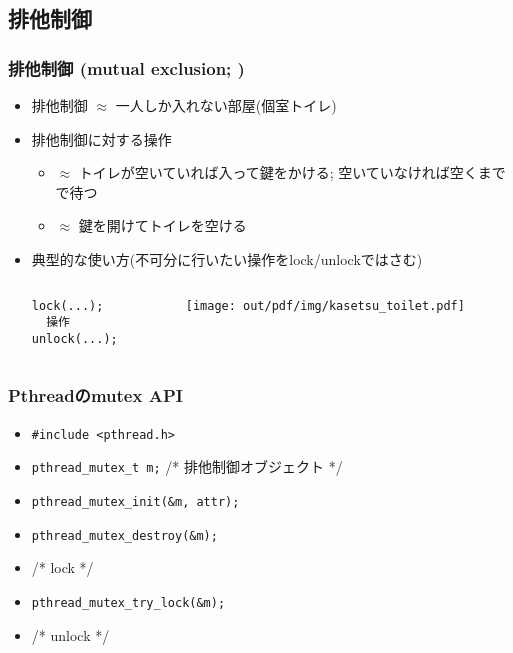 \documentclass[12pt,dvipdfmx]{beamer}
\begin{document}
\subsection{排他制御}

\begin{frame}[fragile]
  \frametitle{排他制御 (mutual exclusion; )}
  \begin{itemize}
  \item 排他制御 $\approx$ 一人しか入れない部屋(個室トイレ)
  \item 排他制御に対する操作
    \begin{itemize}
    \item {} $\approx$ トイレが空いていれば入って鍵をかける;
      空いていなければ空くまでで待つ
    \item {} $\approx$ 鍵を開けてトイレを空ける
    \end{itemize}
  \item 典型的な使い方(不可分に行いたい操作をlock/unlockではさむ)
    \begin{columns}
      \begin{column}{0.5\textwidth}
\begin{lstlisting}
lock(...);
  操作
unlock(...);
\end{lstlisting}
      \end{column}
      \begin{column}{0.5\textwidth}
        \begin{center}
\texttt{[image: out/pdf/img/kasetsu\_toilet.pdf]}
        \end{center}
      \end{column}
    \end{columns}
  \end{itemize}
\end{frame}

\begin{frame}
  \frametitle{Pthreadのmutex API}
  \begin{itemize}
  \item {\tt \#include <pthread.h>}
  \item {\tt pthread\_mutex\_t m;} /* 排他制御オブジェクト */
  \item {\tt pthread\_mutex\_init(\&m, attr);}
  \item {\tt pthread\_mutex\_destroy(\&m);}
  \item {}   /* lock */
  \item {\tt pthread\_mutex\_try\_lock(\&m);}
  \item {} /* unlock */
  \end{itemize}
\end{frame}
\end{document}
